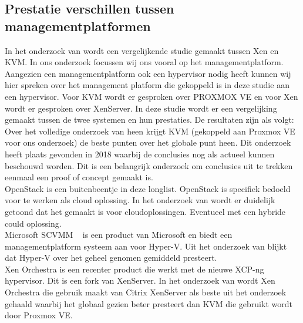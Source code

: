 \subsection{Prestatie verschillen tussen managementplatformen} \label{subsec:performace}
In het onderzoek van \textcite{algarni2018performance} wordt een vergelijkende studie gemaakt tussen Xen en KVM. In ons onderzoek focussen wij ons vooral op het managementplatform.
Aangezien een managementplatform ook een hypervisor nodig heeft kunnen wij hier spreken over het management platform die gekoppeld is in deze studie aan een hypervisor.
Voor KVM wordt er gesproken over PROXMOX VE en voor Xen wordt er gesproken over XenServer. In deze studie wordt er een vergelijking gemaakt tussen de twee systemen en hun prestaties. De resultaten zijn als volgt:
Over het volledige onderzoek van \textcite{algarni2018performance} heen krijgt KVM (gekoppeld aan Proxmox VE voor ons onderzoek) de beste punten over het globale punt heen. Dit onderzoek heeft plaats gevonden in 2018 waarbij de conclusies nog als actueel kunnen beschouwd worden.
Dit is een belangrijk onderzoek om conclusies uit te trekken eenmaal een proof of concept gemaakt is. \\
OpenStack is een buitenbeentje in deze longlist. OpenStack is specifiek bedoeld voor te werken als cloud oplossing. In het onderzoek van \textcite{callegati2014performance} wordt er duidelijk getoond dat het gemaakt is voor cloudoplossingen. Eventueel met een hybride could oplossing. \\
Microsoft SCVMM ~\autocite{microsoftvmm2025}  is een product van Microsoft en biedt een managementplatform systeem aan voor Hyper-V. Uit het onderzoek van \textcite{fayyad2013benchmarking} blijkt dat Hyper-V over het geheel genomen gemiddeld presteert. \\
Xen Orchestra is een recenter product die werkt met de nieuwe XCP-ng hypervisor. Dit is een fork van XenServer. In het onderzoek van \textcite{el2021server} wordt Xen Orchestra die gebruik maakt van Citrix XenServer als beste uit het onderzoek gehaald waarbij het globaal gezien beter presteert dan KVM die gebruikt wordt door Proxmox VE. \\

